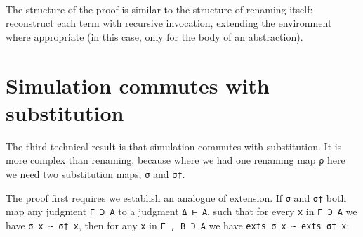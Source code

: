 \begin{fence}
\begin{code}
\>[0]\AgdaSpace{}%
\AgdaSpace{}%
\AgdaSymbol{(}\AgdaSpace{}%
\AgdaSpace{}%
\AgdaSymbol{)}%
\>[24]\AgdaSymbol{=}%
\>[27]\AgdaSymbol{(}\AgdaSpace{}%
\AgdaSpace{}%
\AgdaSymbol{)}\AgdaSpace{}%
\AgdaSpace{}%
\AgdaSymbol{(}\AgdaSpace{}%
\AgdaSpace{}%
\AgdaSymbol{)}\<%
\\
\>[0]\AgdaSpace{}%
\AgdaSpace{}%
\AgdaSymbol{(}\AgdaSpace{}%
\AgdaSpace{}%
\AgdaSymbol{)}%
\>[24]\AgdaSymbol{=}%
\>[27]\AgdaSpace{}%
\AgdaSymbol{(}\AgdaSpace{}%
\AgdaSpace{}%
\AgdaSymbol{)}\AgdaSpace{}%
\AgdaSymbol{(}\AgdaSpace{}%
\AgdaSymbol{(}\AgdaSpace{}%
\AgdaSymbol{)}\AgdaSpace{}%
\AgdaSymbol{)}\<%
\end{code}
\end{fence}

The structure of the proof is similar to the structure of renaming
itself: reconstruct each term with recursive invocation, extending the
environment where appropriate (in this case, only for the body of an
abstraction).

\hypertarget{simulation-commutes-with-substitution}{%
\section{Simulation commutes with
substitution}\label{simulation-commutes-with-substitution}}

The third technical result is that simulation commutes with
substitution. It is more complex than renaming, because where we had one
renaming map \texttt{ρ} here we need two substitution maps, \texttt{σ}
and \texttt{σ†}.

The proof first requires we establish an analogue of extension. If
\texttt{σ} and \texttt{σ†} both map any judgment \texttt{Γ\ ∋\ A} to a
judgment \texttt{Δ\ ⊢\ A}, such that for every \texttt{x} in
\texttt{Γ\ ∋\ A} we have \texttt{σ\ x\ \textasciitilde{}\ σ†\ x}, then
for any \texttt{x} in \texttt{Γ\ ,\ B\ ∋\ A} we have
\texttt{exts\ σ\ x\ \textasciitilde{}\ exts\ σ†\ x}:

